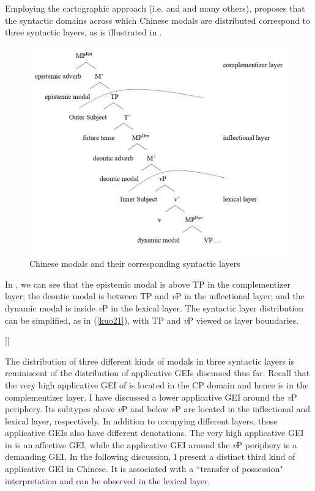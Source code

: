 \documentclass[output=paper,colorlinks,citecolor=brown]{langscibook}
\begin{document}
Employing the cartographic approach (i.e. \citealt{rizzi1997} and \citealt{cinque1999} and many others), \citet{Tsai2015a} proposes that the syntactic domains across which Chinese modals are distributed correspond to three syntactic layers, as is illustrated in .

\begin{figure}
\caption{Chinese modals and their corresponding syntactic layers\label{kuo20}}
\includegraphics[align=t,width=11.5cm]{figures/tree2.jpg}
\end{figure}

In , we can see that the epistemic modal is above TP in the complementizer layer; the deontic modal is between TP and \textit{v}P in the inflectional layer; and the dynamic modal is inside \textit{v}P in the lexical layer. The syntactic layer distribution can be simplified, as in (\ref{kuo21}), with TP and \textit{v}P viewed as layer boundaries.

\ea
\label{kuo21}
\glt    [ complementizer layer  [\textsubscript{TP}    inflectional layer  [\textsubscript{\textit{v}P}   lexical layer .....]]]\\  
\z

The distribution of three different kinds of modals in three syntactic layers is reminiscent of the distribution of applicative GEIs discussed thus far. Recall that the very high applicative GEI of  \citet{Tsai2017} is located in the CP domain and hence is in the complementizer layer. I have discussed a lower applicative GEI around the \textit{v}P periphery. Its subtypes above \textit{v}P and below \textit{v}P are located in the inflectional and lexical layer, respectively. In addition to occupying different layers, these applicative GEIs also have different denotations. The very high applicative GEI in \citet{Tsai2017} is an affective GEI, while the applicative GEI around the \textit{v}P periphery is a demanding GEI. In the following discussion, I present a distinct third kind of applicative GEI in Chinese. It is associated with a “transfer of possession" interpretation and can be observed in the lexical layer.
\end{document}
